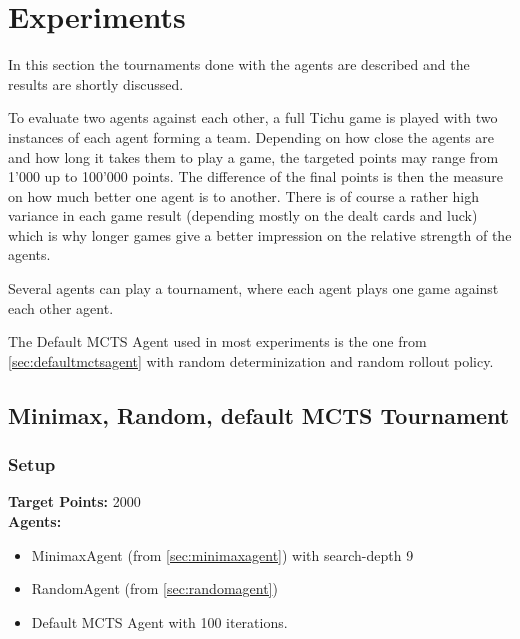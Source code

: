 \chapter{Experiments}
\label{ch:experiments}
In this section the tournaments done with the agents are described and the results are shortly discussed.

To evaluate two agents against each other, a full Tichu game is played with two instances of each agent forming a team.
Depending on how close the agents are and how long it takes them to play a game, the targeted points may range from 1'000 up to 100'000 points.
The difference of the final points is then the measure on how much better one agent is to another.
There is of course a rather high variance in each game result (depending mostly on the dealt cards and luck) which is why longer games give a better impression on the relative strength of the agents.

Several agents can play a tournament, where each agent plays one game against each other agent.

The Default MCTS Agent used in most experiments is the one from \ref{sec:defaultmctsagent} with random determinization and random rollout policy.

\section{Minimax, Random, default MCTS Tournament}
\label{sec:minimaxtournament}

\subsection*{Setup}
\textbf{Target Points:} 2000\\
\textbf{Agents:}
\begin{itemize}
    \setlength\itemsep{2px}
    \item MinimaxAgent (from \ref{sec:minimaxagent}) with search-depth 9
    \item RandomAgent (from \ref{sec:randomagent})
    \item Default MCTS Agent with 100 iterations.
\end{itemize}


